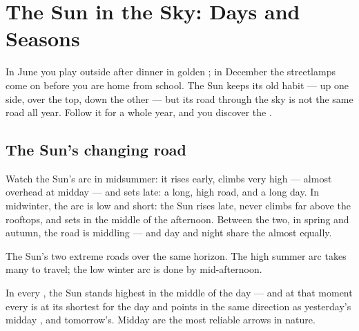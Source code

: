 \chapter{The Sun in the Sky: Days and Seasons}\label{ch:g3:sun-days-seasons}

In June you play outside after dinner in golden ; in December
the streetlamps come on before you are home from school. The Sun
keeps its old habit --- up one side, over the top, down the other ---
but its road through the sky is not the same road all year. Follow
it for a whole year, and you discover the .

\section{The Sun's changing road}

\begin{example}\label{ex:g3:sun-days-seasons:roads}
Watch the Sun's arc in midsummer: it rises early, climbs very high
--- almost overhead at midday --- and sets late: a long, high road,
and a long day. In midwinter, the arc is low and short: the Sun
rises late, never climbs far above the rooftops, and sets in the
middle of the afternoon. Between the two, in spring and autumn, the
road is middling --- and day and night share the  almost
equally.
\end{example}

\begin{omfigure}

{\small The Sun's two extreme roads over the same horizon. The high
summer arc takes many  to travel; the low winter arc is done by
mid-afternoon.}
\end{omfigure}

\begin{proposition}\label{prop:g3:sun-days-seasons:midday}
In every , the Sun stands highest in the middle of the day ---
and at that moment every  is at its shortest for the day and
points in the same direction as yesterday's midday , and
tomorrow's. Midday  are the most reliable arrows in nature.
\end{proposition}

